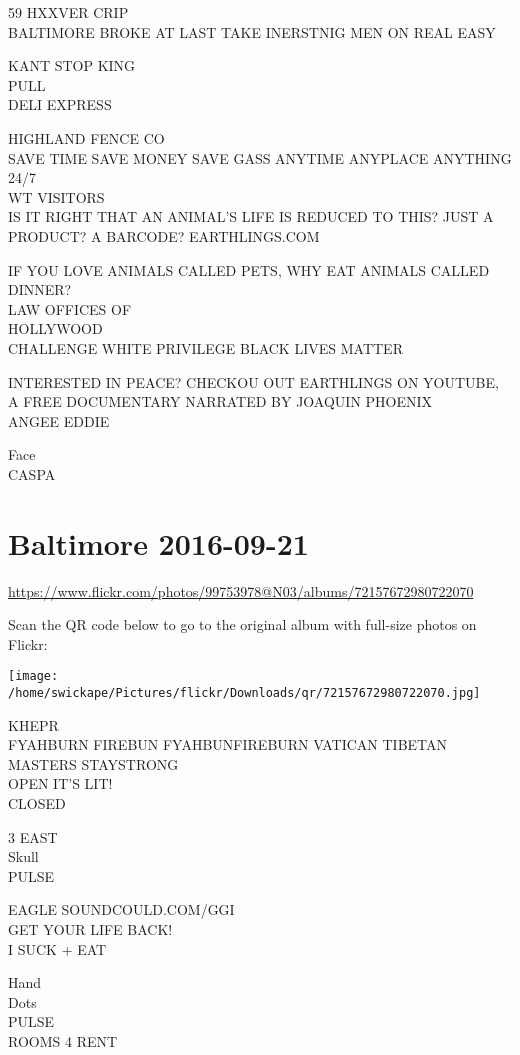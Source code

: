 \documentclass[10pt,letterpaper]{article}
\begin{document}
59 HXXVER CRIP\\
BALTIMORE BROKE AT LAST TAKE INERSTNIG MEN ON REAL EASY

KANT STOP KING\\
PULL\\
DELI EXPRESS

HIGHLAND FENCE CO\\
SAVE TIME SAVE MONEY SAVE GASS ANYTIME ANYPLACE ANYTHING 24/7\\
WT VISITORS\\
IS IT RIGHT THAT AN ANIMAL'S LIFE IS REDUCED TO THIS?  JUST A PRODUCT?  A BARCODE?  EARTHLINGS.COM

IF YOU LOVE ANIMALS CALLED PETS, WHY EAT ANIMALS CALLED DINNER?\\
LAW OFFICES OF\\
HOLLYWOOD\\
CHALLENGE WHITE PRIVILEGE BLACK LIVES MATTER

INTERESTED IN PEACE?  CHECKOU OUT EARTHLINGS ON YOUTUBE, A FREE DOCUMENTARY NARRATED BY JOAQUIN PHOENIX\\
ANGEE EDDIE

Face\\
CASPA


\section*{Baltimore 2016-09-21}

\url{https://www.flickr.com/photos/99753978@N03/albums/72157672980722070}

Scan the QR code below to go to the original album with full-size photos on Flickr:

\texttt{[image: /home/swickape/Pictures/flickr/Downloads/qr/72157672980722070.jpg]}


KHEPR\\
FYAHBURN FIREBUN FYAHBUNFIREBURN VATICAN TIBETAN MASTERS STAYSTRONG\\
OPEN IT'S LIT!\\
CLOSED

3 EAST\\
Skull\\
PULSE

EAGLE SOUNDCOULD.COM/GGI\\
GET YOUR LIFE BACK!\\
I SUCK + EAT

Hand\\
Dots\\
PULSE\\
ROOMS 4 RENT
\end{document}
